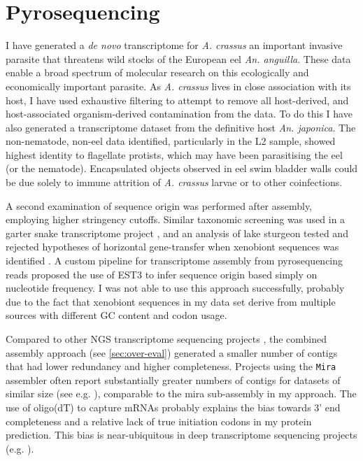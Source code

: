 \section{Pyrosequencing}
\label{sec:454-pyr}

I have generated a \textit{de novo} transcriptome for
\textit{A. crassus} an important invasive parasite that threatens wild
stocks of the European eel \textit{An. anguilla}. These data enable a
broad spectrum of molecular research on this ecologically and
economically important parasite. As \textit{A. crassus} lives in close
association with its host, I have used exhaustive filtering to attempt
to remove all host-derived, and host-associated organism-derived
contamination from the data. To do this I have also generated a
transcriptome dataset from the definitive host
\textit{An. japonica}. The non-nematode, non-eel data identified,
particularly in the L2 sample, showed highest identity to flagellate
protists, which may have been parasitising the eel (or the
nematode). Encapsulated objects observed in eel swim bladder walls
\cite{heitlinger_massive_2009} could be due solely to immune attrition
of \textit{A. crassus} larvae or to other coinfections.

A second examination of sequence origin was performed after assembly,
employing higher stringency cutoffs. Similar taxonomic screening was
used in a garter snake transcriptome project \cite{pmid21138572}, and
an analysis of lake sturgeon tested and rejected hypotheses of
horizontal gene-transfer when xenobiont sequences was identified
\cite{pmid20386959}. A custom pipeline for transcriptome assembly from
pyrosequencing reads \cite{pmid20034392} proposed the use of EST3
\cite{pmid17218127} to infer sequence origin based simply on
nucleotide frequency. I was not able to use this approach
successfully, probably due to the fact that xenobiont sequences in my
data set derive from multiple sources with different GC content and
codon usage.

Compared to other NGS transcriptome sequencing projects
\cite{pmid20478048}, the combined assembly approach (see
\ref{sec:over-eval}) generated a smaller number of contigs that had
lower redundancy and higher completeness. Projects using the
\texttt{Mira} assembler often report substantially greater numbers of
contigs for datasets of similar size (see e.g. \cite{pmid21364769}),
comparable to the mira sub-assembly in my approach. The use of
oligo(dT) to capture mRNAs probably explains the bias towards 3' end
completeness and a relative lack of true initiation codons in my
protein prediction. This bias is near-ubiquitous in deep transcriptome
sequencing projects (e.g. \cite{pmid20331785}).

